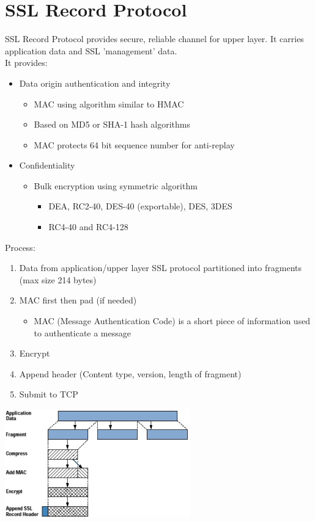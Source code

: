\documentclass{article}
\begin{document}
\section{SSL Record Protocol}
SSL Record Protocol provides secure, reliable channel for upper layer.
It carries application data and SSL 'management' data.\\
It provides:
\begin{itemize}
    \item Data origin authentication and integrity
    \begin{itemize}
        \item MAC using algorithm similar to HMAC
        \item Based on MD5 or SHA-1 hash algorithms
        \item MAC protects 64 bit sequence number for anti-replay
    \end{itemize}
    \item Confidentiality
    \begin{itemize}
        \item Bulk encryption using symmetric algorithm
        \begin{itemize}
            \item DEA, RC2-40, DES-40 (exportable), DES, 3DES
            \item RC4-40 and RC4-128
        \end{itemize}
    \end{itemize}
\end{itemize}
Process:
\begin{enumerate}
    \item Data from application/upper layer SSL protocol partitioned into fragments (max size 214 bytes)
    \item MAC first then pad (if needed)
    \begin{itemize}
        \item MAC (Message Authentication Code) is a short piece of information used to authenticate a message
    \end{itemize}
    \item Encrypt
    \item Append header (Content type, version, length of fragment)
    \item Submit to TCP
\end{enumerate}
\includegraphics[width=8cm]{SSL_Record_Protocol.png}
\end{document}

